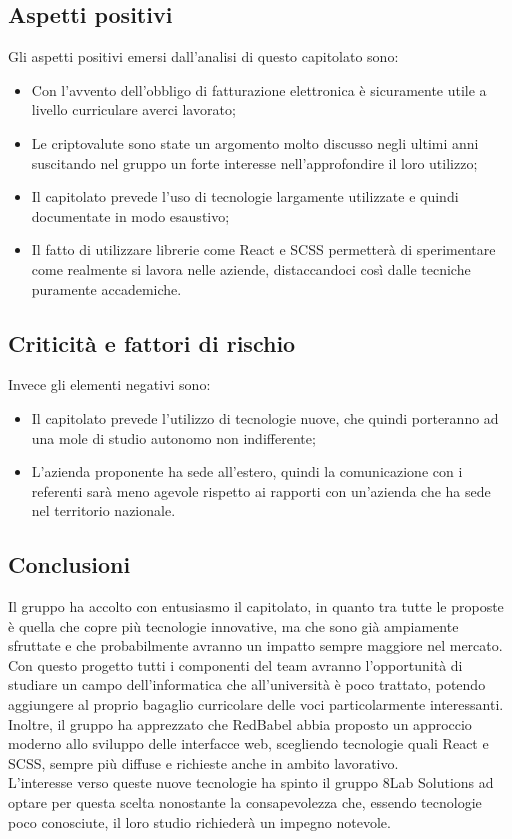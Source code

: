 \subsection{Aspetti positivi}
Gli aspetti positivi emersi dall'analisi di questo capitolato sono:
\begin{itemize}
	\item Con l'avvento dell'obbligo di fatturazione elettronica è sicuramente
	utile a livello curriculare averci lavorato;
	\item Le criptovalute sono state un argomento molto discusso negli ultimi anni 
suscitando nel gruppo un forte interesse nell'approfondire il loro utilizzo;
	\item Il capitolato prevede l'uso di tecnologie largamente utilizzate e quindi 
documentate in modo esaustivo;
	\item Il fatto di utilizzare librerie come React e SCSS permetterà di
	sperimentare come realmente si lavora nelle aziende, distaccandoci così dalle 
tecniche puramente accademiche.
\end{itemize}

\subsection{Criticità  e fattori di rischio}
Invece gli elementi negativi sono:
\begin{itemize}
	\item Il capitolato prevede l'utilizzo di tecnologie nuove, che quindi 
porteranno ad una mole di studio autonomo non indifferente;
	\item L'azienda proponente ha sede all'estero, quindi la comunicazione con i 
referenti sarà meno agevole rispetto ai rapporti con un'azienda che ha sede nel 
territorio nazionale.
\end{itemize}

\subsection{Conclusioni} Il gruppo ha accolto con entusiasmo il capitolato, in 
quanto tra tutte le proposte è quella che copre più tecnologie innovative, ma 
che sono già ampiamente sfruttate e che probabilmente avranno un impatto sempre 
maggiore nel mercato. Con questo progetto tutti i componenti del team avranno 
l'opportunità di studiare un campo dell'informatica che all'università è poco 
trattato, potendo aggiungere al proprio bagaglio curricolare delle voci 
particolarmente interessanti. Inoltre, il gruppo ha apprezzato che RedBabel abbia
proposto un approccio moderno allo sviluppo delle interfacce web, scegliendo 
tecnologie quali React e SCSS, sempre più diffuse e richieste anche in ambito lavorativo.\\
L'interesse verso queste nuove tecnologie ha spinto il gruppo 8Lab Solutions ad 
optare per questa scelta nonostante la consapevolezza che, essendo tecnologie 
poco conosciute, il loro studio richiederà un impegno notevole.


